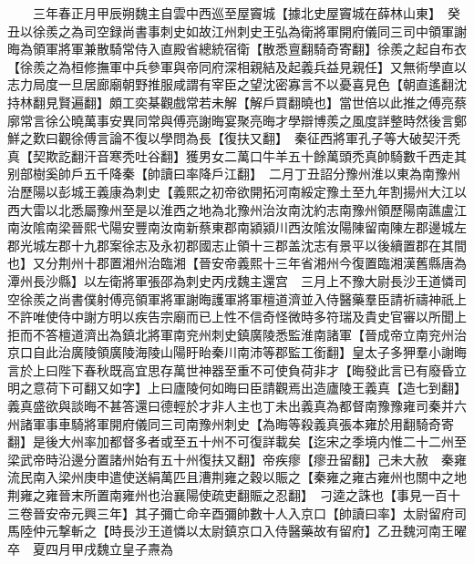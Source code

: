 　　三年春正月甲辰朔魏主自雲中西巡至屋竇城【據北史屋竇城在薛林山東】　癸丑以徐羨之為司空録尚書事刺史如故江州刺史王弘為衛將軍開府儀同三司中領軍謝晦為領軍將軍兼散騎常侍入直殿省總統宿衛【散悉亶翻騎奇寄翻】徐羨之起自布衣【徐羨之為桓修撫軍中兵參軍與帝同府深相親結及起義兵益見親任】又無術學直以志力局度一旦居廊廟朝野推服咸謂有宰臣之望沈密寡言不以憂喜見色【朝直遙翻沈持林翻見賢遍翻】頗工奕棊觀戲常若未解【解戶買翻曉也】當世倍以此推之傅亮蔡廓常言徐公曉萬事安異同常與傅亮謝晦宴聚亮晦才學辯博羨之風度詳整時然後言鄭鮮之歎曰觀徐傅言論不復以學問為長【復扶又翻】　秦征西將軍孔子等大破契汗秃真【契欺訖翻汗音寒秃吐谷翻】獲男女二萬口牛羊五十餘萬頭禿真帥騎數千西走其别部樹奚帥戶五千降秦【帥讀曰率降戶江翻】　二月丁丑詔分豫州淮以東為南豫州治歷陽以彭城王義康為刺史【義熙之初帝欲開拓河南綏定豫土至九年割揚州大江以西大雷以北悉屬豫州至是以淮西之地為北豫州治汝南沈約志南豫州領歷陽南譙盧江南汝隂南梁晉熙弋陽安豐南汝南新蔡東郡南潁潁川西汝隂汝陽陳留南陳左郡邊城左郡光城左郡十九郡案徐志及永初郡國志止領十三郡盖沈志有景平以後續置郡在其間也】又分荆州十郡置湘州治臨湘【晉安帝義熙十三年省湘州今復置臨湘漢舊縣唐為潭州長沙縣】以左衛將軍張邵為刺史丙戌魏主還宫　三月上不豫大尉長沙王道憐司空徐羨之尚書僕射傅亮領軍將軍謝晦護軍將軍檀道濟並入侍醫藥羣臣請祈禱神祇上不許唯使侍中謝方明以疾告宗廟而已上性不信奇怪微時多符瑞及貴史官審以所聞上拒而不答檀道濟出為鎮北將軍南兖州刺史鎮廣陵悉監淮南諸軍【晉成帝立南兖州治京口自此治廣陵領廣陵海陵山陽盱眙秦川南沛等郡監工銜翻】皇太子多狎羣小謝晦言於上曰陛下春秋既高宜思存萬世神器至重不可使負荷非才【晦發此言已有廢昏立明之意荷下可翻又如字】上曰廬陵何如晦曰臣請觀焉出造廬陵王義真【造七到翻】義真盛欲與談晦不甚答還曰德輕於才非人主也丁未出義真為都督南豫豫雍司秦并六州諸軍事車騎將軍開府儀同三司南豫州刺史【為晦等殺義真張本雍於用翻騎奇寄翻】是後大州率加都督多者或至五十州不可復詳載矣【迄宋之季境内惟二十二州至梁武帝時沿邊分置諸州始有五十州復扶又翻】帝疾瘳【瘳丑留翻】己未大赦　秦雍流民南入梁州庚申遣使送絹萬匹且漕荆雍之穀以賑之【秦雍之雍古雍州也關中之地荆雍之雍晉末所置南雍州也治襄陽使疏吏翻賑之忍翻】　刁逵之誅也【事見一百十三卷晉安帝元興三年】其子彌亡命辛酉彌帥數十人入京口【帥讀曰率】太尉留府司馬陸仲元撃斬之【時長沙王道憐以太尉鎮京口入侍醫藥故有留府】乙丑魏河南王曜卒　夏四月甲戌魏立皇子燾為

